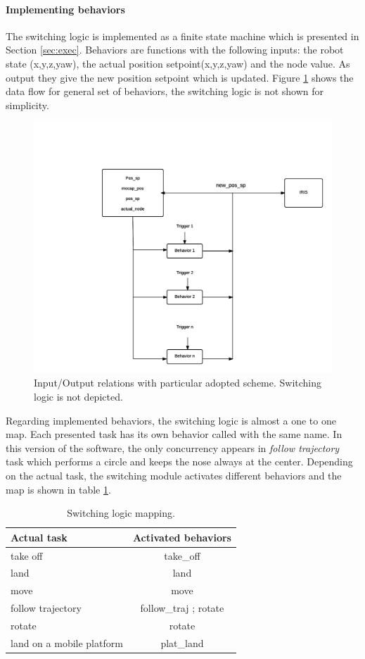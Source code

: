 \paragraph{Implementing behaviors} The switching logic is implemented as a finite state machine which is presented in Section \ref{sec:exec}. Behaviors are functions with the following inputs: the robot state (x,y,z,yaw), the actual position setpoint(x,y,z,yaw) and the node value. As output they give the new position setpoint which is updated. Figure \ref{figure:flow} shows the data flow for general set of behaviors, the switching logic is not shown for simplicity. 
\begin{figure}[h]
\centering
 \includegraphics[width=\textwidth]{behav_flow.png}
 \caption[Behavior data flow]{Input/Output relations with particular adopted scheme. Switching logic is not depicted.}
 \label{figure:flow}
\end{figure}
Regarding implemented behaviors, the switching logic is almost a one to one map. Each presented task has its own behavior called with the same name. In this version of the software, the only concurrency appears in \textit{follow trajectory} task which performs a circle and keeps the nose always at the center. Depending on the actual task, the switching module activates different behaviors and the map is shown in table \ref{tab:map}.
\begin{table}[h]
\centering
\begin{tabular}{l|c}
Actual task               & Activated behaviors   \\ \hline
take off                  & take\_off             \\
land                      & land                  \\
move                      & move                  \\
follow trajectory         & follow\_traj ; rotate \\
rotate                    & rotate                \\
land on a mobile platform & plat\_land           
\end{tabular}
\caption{Switching logic mapping.}
\label{tab:map}
\end{table}

